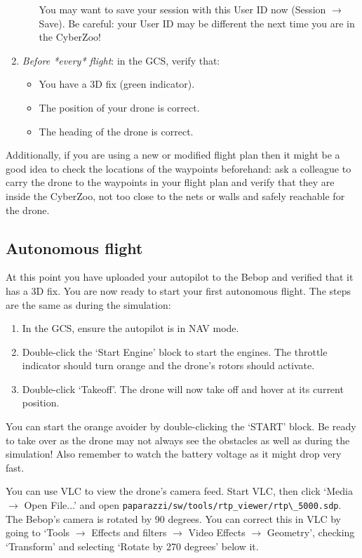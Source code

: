 \begin{enumerate}
\begin{enumerate}
		You may want to save your session with this User ID now (Session $\rightarrow$ Save). Be careful: your User ID may be different the next time you are in the CyberZoo!
	\end{enumerate}
	\item \emph{Before *every* flight}: in the GCS, verify that:
	\begin{itemize}
		\item You have a 3D fix (green indicator).
		\item The position of your drone is correct.
		\item The heading of the drone is correct.
	\end{itemize}
\end{enumerate}
	
Additionally, if you are using a new or modified flight plan then it might be a good idea to check the locations of the waypoints beforehand: ask a colleague to carry the drone to the waypoints in your flight plan and verify that they are inside the CyberZoo, not too close to the nets or walls and safely reachable for the drone.
	
\subsection*{Autonomous flight}
At this point you have uploaded your autopilot to the Bebop and verified that it has a 3D fix.
You are now ready to start your first autonomous flight.
The steps are the same as during the simulation:

\begin{enumerate}
	\item In the GCS, ensure the autopilot is in NAV mode.
	\item Double-click the `Start Engine' block to start the engines. The throttle indicator should turn orange and the drone's rotors should activate.
	\item Double-click `Takeoff'. The drone will now take off and hover at its current position.
\end{enumerate}

You can start the orange avoider by double-clicking the `START' block. Be ready to take over as the drone may not always see the obstacles as well as during the simulation! Also remember to watch the battery voltage as it might drop very fast.

You can use VLC to view the drone's camera feed. Start VLC, then click `Media $\rightarrow$ Open File...' and open \verb"paparazzi/sw/tools/rtp_viewer/rtp\_5000.sdp".
The Bebop's camera is rotated by 90 degrees. You can correct this in VLC by going to `Tools $\rightarrow$ Effects and filters $\rightarrow$ Video Effects $\rightarrow$ Geometry', checking `Transform' and selecting `Rotate by 270 degrees' below it.

